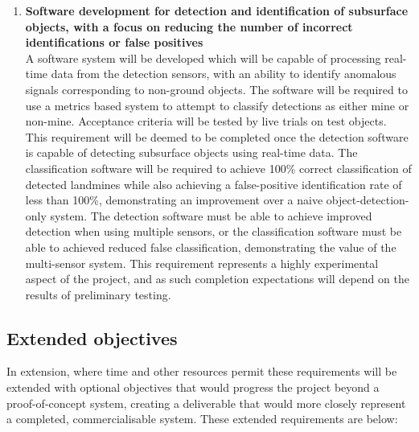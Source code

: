 \documentclass[main.tex]{subfiles}
\begin{document}
\begin{enumerate}
\item \textbf{Software development for detection and identification of subsurface objects, with a focus on reducing the number of incorrect identifications or false positives}\\ 
A software system will be developed which will be capable of processing real-time data from the detection sensors, with an ability to identify anomalous signals corresponding to non-ground objects. 
The software will be required to use a metrics based system to attempt to classify detections as either mine or non-mine. 
Acceptance criteria will be tested by live trials on test objects. 
This requirement will be deemed to be completed once the detection software is capable of detecting subsurface objects using real-time data. 
The classification software will be required to achieve 100\% correct classification of detected landmines while also achieving a false-positive identification rate of less than 100\%, demonstrating an improvement over a naive object-detection-only system. 
The detection software must be able to achieve improved detection when using multiple sensors, or the classification software must be able to achieved reduced false classification, demonstrating the value of the multi-sensor system. 
This requirement represents a highly experimental aspect of the project, and as such completion expectations will depend on the results of preliminary testing. 
\end{enumerate}

\subsection{Extended objectives}
In extension, where time and other resources permit these requirements will be extended with optional objectives that would progress the project beyond a proof-of-concept system, creating a deliverable that would more closely represent a completed, commercialisable system. 
These extended requirements are below:
\end{document}
